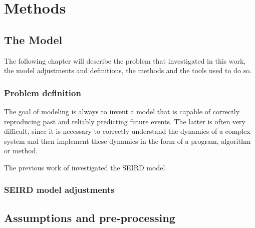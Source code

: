 
\chapter{Methods} %

\label{chap:methods} %


\section{The Model}
The following chapter will describe the problem that investigated in this work, the model adjustments and definitions,
the methods and the tools used to do so.
\subsection{Problem definition}
The goal of modeling is always to invent a model that is capable of correctly reproducing past and reliably predicting 
future events. The latter is often very difficult, since it is necessary to correctly understand the dynamics of a
complex system and then implement these dynamics in the form of a program, algorithm or method.\newline

\par
The previous work of \cite{Rastogi} investigated the SEIRD model

\subsection{SEIRD model adjustments}
\label{sec:SEIRDredef}


\section{Assumptions and pre-processing}



